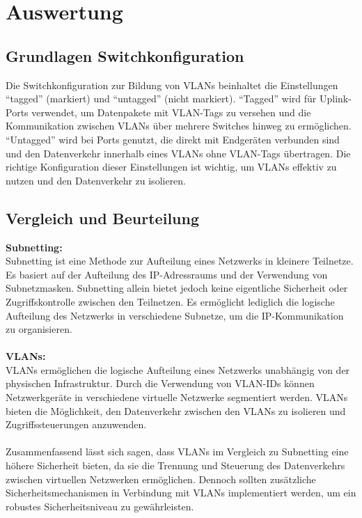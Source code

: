 
\newpage
\section{Auswertung}

    \subsection{Grundlagen Switchkonfiguration}
    
    Die Switchkonfiguration zur Bildung von VLANs beinhaltet die Einstellungen "`tagged"' (markiert) und "`untagged"' (nicht markiert). 
    "`Tagged"' wird für Uplink-Ports verwendet, um Datenpakete mit VLAN-Tags zu versehen und die Kommunikation zwischen VLANs über mehrere 
    Switches hinweg zu ermöglichen. "`Untagged"' wird bei Ports genutzt, die direkt mit Endgeräten verbunden sind und den Datenverkehr innerhalb 
    eines VLANs ohne VLAN-Tags übertragen. Die richtige Konfiguration dieser Einstellungen ist wichtig, um VLANs effektiv zu nutzen und den Datenverkehr 
    zu isolieren.
    
    \subsection{Vergleich und Beurteilung}
    \textbf{Subnetting:}
    \\Subnetting ist eine Methode zur Aufteilung eines Netzwerks in kleinere Teilnetze. Es basiert auf der Aufteilung des IP-Adressraums und der 
    Verwendung von Subnetzmasken. Subnetting allein bietet jedoch keine eigentliche Sicherheit oder Zugriffskontrolle zwischen den Teilnetzen. Es ermöglicht lediglich die logische Aufteilung 
    des Netzwerks in verschiedene Subnetze, um die IP-Kommunikation zu organisieren.
    \\\\\textbf{VLANs:}
    \\VLANs ermöglichen die logische Aufteilung eines Netzwerks unabhängig von der physischen Infrastruktur. Durch die Verwendung von VLAN-IDs können Netzwerkgeräte in verschiedene virtuelle 
    Netzwerke segmentiert werden. VLANs bieten die Möglichkeit, den Datenverkehr zwischen den VLANs zu isolieren und Zugriffssteuerungen anzuwenden.
    \\\\Zusammenfassend lässt sich sagen, dass VLANs im Vergleich zu Subnetting eine höhere Sicherheit bieten, da sie die Trennung und Steuerung des Datenverkehrs zwischen virtuellen Netzwerken 
    ermöglichen. Dennoch sollten zusätzliche Sicherheitsmechanismen in Verbindung mit VLANs implementiert werden, um ein robustes Sicherheitsniveau zu gewährleisten.

